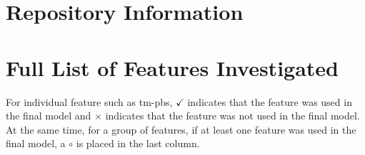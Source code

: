 \chapter{Repository Information}
\label{appendix:repository}


\chapter{Full List of Features Investigated}
\label{appendix:features}

For individual feature such as tm-pbs, $\checkmark$ indicates that the feature was used in the final model and $\times$ indicates that the feature was not used in the final model. At the same time, for a group of features, if at least one feature was used in the final model, a $\circ$ is placed in the last column. 

